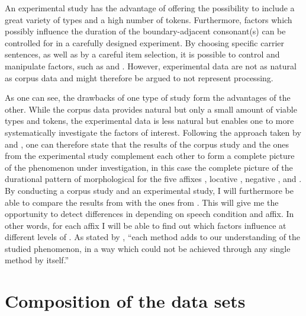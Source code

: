 
An experimental study has the advantage of offering the possibility to include a great variety of types and a high number of tokens. Furthermore, factors which possibly influence the duration of the boundary-adjacent consonant(s) can be controlled for in a carefully designed experiment. By choosing specific carrier sentences, as well as by a careful item selection, it is possible to control and manipulate factors, such as  and . 
However, experimental data are not as natural as corpus data and might therefore be argued to not represent  processing. 

As one can see, the drawbacks of one type of study form the advantages of the other. While the corpus data provides natural  but only a small amount of viable types and tokens, the experimental data is less natural but enables one to more systematically investigate the factors of interest.
Following the approach taken by \cite{Arppe.2007} and \cite{Kunter.13.04.2017}, one can therefore state that the results of the corpus study and the ones from the experimental study complement each other to form a complete picture of the phenomenon under investigation, in this case the complete picture of the durational pattern of morphological   for the five affixes , locative , negative ,  and .
By conducting a corpus study and an experimental study, I will furthermore be able to compare the results from  with the ones from . This will give me the opportunity to detect differences in  depending on speech condition and affix. In other words, for each affix I will be able to find out which factors influence  at different levels of . As stated by \citet[1]{Arppe.2007}, ``each method adds to our understanding of the studied phenomenon, in a way which could not be achieved through any single method by itself.''




\section{Composition of the data sets} \label{General Method Data Sets}

